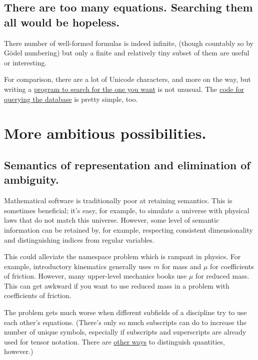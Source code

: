 \documentclass[12pt,letterpaper]{article}
\begin{document}
\subsection{There are too many equations. Searching them all would be hopeless.}

There number of well-formed formulas is indeed infinite,
(though countably so by Gödel numbering)
but only a finite and relatively tiny subset of them are useful or interesting.

For comparison,
there are a lot of Unicode characters,
and more on the way,
but writing a
\href{https://mail.python.org/pipermail/python-announce-list/2003-April/002183.html}
{program to search for the one you want} is not unusual.
The
\href{http://sources.debian.net/src/unicode/0.9.7/unicode}
{code for querying the database} is pretty simple, too.

\section{More ambitious possibilities.}\label{sec:ambitious}

\subsection{Semantics of representation and elimination of ambiguity.}

Mathematical software is traditionally poor at retaining semantics.
This is sometimes beneficial;
it's easy, for example,
to simulate a universe with physical laws that do not match this universe.
However, some level of semantic information can be retained by,
for example, respecting consistent dimensionality and distinguishing indices from regular variables.

This could alleviate the namespace problem which is rampant in physics.
For example,
introductory kinematics generally uses $m$ for mass and $\mu$ for coefficients of friction.
However, many upper-level mechanics books use $\mu$ for reduced mass.
This can get awkward if you want to use reduced mass in a problem with coefficients of friction.

The problem gets much worse when different subfields of a discipline try to use each other's equations.
(There's only so much subscripts can do to increase the number of unique symbols,
especially if subscripts and superscripts are already used for tensor notation.
There are \hyperref[color-coding]{other ways} to distinguish quantities, however.)
\end{document}
